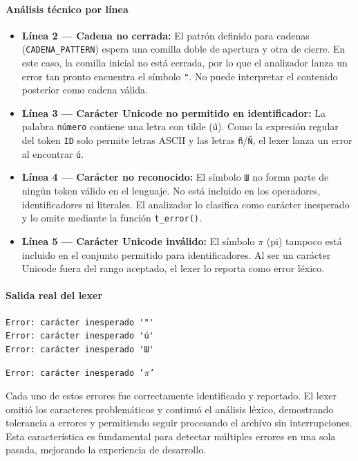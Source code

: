 \documentclass{article}
\begin{document}
\paragraph{Análisis técnico por línea}

\begin{itemize}
  \item \textbf{Línea 2 — Cadena no cerrada:} El patrón definido para cadenas (\texttt{CADENA\_PATTERN}) espera una comilla doble de apertura y otra de cierre. En este caso, la comilla inicial no está cerrada, por lo que el analizador lanza un error tan pronto encuentra el símbolo \texttt{"}. No puede interpretar el contenido posterior como cadena válida.

  \item \textbf{Línea 3 — Carácter Unicode no permitido en identificador:} La palabra \texttt{número} contiene una letra con tilde (\texttt{ú}). Como la expresión regular del token \texttt{ID} solo permite letras ASCII y las letras \texttt{ñ}/\texttt{Ñ}, el lexer lanza un error al encontrar \texttt{ú}.

  \item \textbf{Línea 4 — Carácter no reconocido:} El símbolo \texttt{Ш} no forma parte de ningún token válido en el lenguaje. No está incluido en los operadores, identificadores ni literales. El analizador lo clasifica como carácter inesperado y lo omite mediante la función \texttt{t\_error()}.

  \item \textbf{Línea 5 — Carácter Unicode inválido:} El símbolo $\pi$ (pi) tampoco está incluido en el conjunto permitido para identificadores. Al ser un carácter Unicode fuera del rango aceptado, el lexer lo reporta como error léxico.
\end{itemize}

\paragraph{Salida real del lexer}

\begin{verbatim}
Error: carácter inesperado '"'
Error: carácter inesperado 'ú'
Error: carácter inesperado 'Ш'
\end{verbatim}
\noindent\texttt{Error: carácter inesperado '$\pi$'}


Cada uno de estos errores fue correctamente identificado y reportado. El lexer omitió los caracteres problemáticos y continuó el análisis léxico, demostrando tolerancia a errores y permitiendo seguir procesando el archivo sin interrupciones. Esta característica es fundamental para detectar múltiples errores en una sola pasada, mejorando la experiencia de desarrollo.
\end{document}
